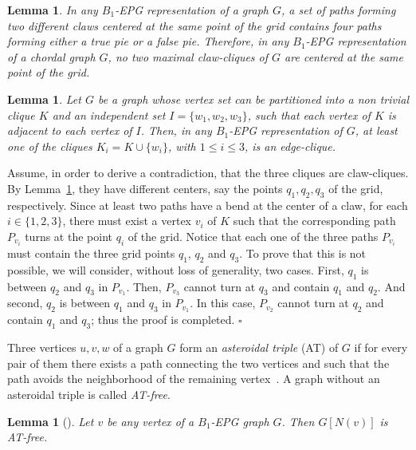 \documentclass[9pt]{entcs}
\newtheorem{lema}[thm]{Lemma}%
\begin{document}
\begin{lema}\label{lem:twoClawNotSameCenterInChordal}
In any $B_1$-EPG representation of a graph $G$, a set of paths forming two different claws centered at the same point of the grid contains four paths forming either a true pie or a false pie. Therefore, in any $B_1$-EPG representation of a chordal graph $G$, no two maximal claw-cliques of $G$ are centered at the same point of the grid.
\end{lema}

\begin{lema}\label{lem:3cliquesNotClaw}
Let $G$ be a graph whose vertex set  can be
partitioned into a non trivial clique $K$ and an independent set $I=\{w_1,w_2,w_3\}$, such that each vertex of $K$ is adjacent to each vertex of $I$. Then, in any $B_1$-EPG representation of $G$, at least one of the cliques  $K_i = K \cup \{w_i\}$, with $1 \leq i \leq 3$,  is an edge-clique. 
\end{lema}

\begin{pf}
Assume, in order to derive a contradiction, that the three cliques are claw-cliques. By Lemma~\ref{lem:twoClawNotSameCenterInChordal}, they have different centers, say the points $q_1, q_2, q_3$ of the grid, respectively. Since at least two paths have a bend at the center of a claw, for each $i\in\{1,2,3\}$,   there must exist a vertex
  $v_i$ of $K$ such that the corresponding path $P_{v_i}$ turns at the point $q_i$ of the grid.  Notice that each one of the three paths $P_{v_i}$
  must contain  the three grid points $q_1$, $q_2$ and $q_3$. To prove that this is not possible, we will consider, without loss of generality, two cases.
  First,  $q_1$ is between $q_2$ and $q_3$ in $P_{v_1}$. Then, $P_{v_3}$ cannot turn at $q_3$ and contain $q_1$ and $q_2$.   And second,
  $q_2$ is between $q_1$ and $q_3$ in $P_{v_1}$. In this case, $P_{v_2}$ cannot turn at $q_2$ and contain $q_1$ and $q_3$; thus the proof is completed.
 \hfill \hfill $\square$
\end{pf}

Three vertices $u, v, w$ of a graph $G$ form an \textit{asteroidal triple} (AT) of $G$ if for every pair of them there exists a path connecting the two vertices and such that the path avoids the neighborhood of the remaining vertex~\cite{Asinowski2009}. A graph without an asteroidal triple is called \textit{AT-free}. 

\begin{lema}
[\cite{ries2009}] \label{l:AT-free} Let $v$ be any vertex of a $B_1$-EPG graph $G$. Then $G[N(v)]$ is AT-free.
\end{lema}
\end{document}
